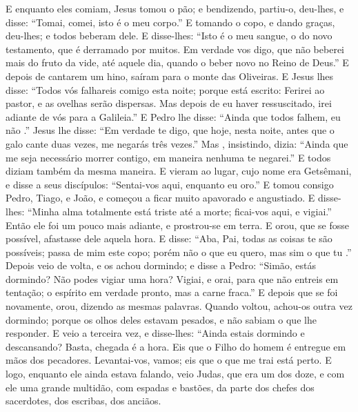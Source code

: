 {  E enquanto eles comiam, Jesus tomou o pão; e bendizendo, partiu-o, deu-lhes, e disse: “Tomai, comei, isto é o meu corpo.”
  E tomando o copo, e dando graças, deu-lhes; e todos beberam dele.
  E disse-lhes: “Isto é o meu sangue, o do novo testamento, que é derramado por muitos.
  Em verdade vos digo, que não beberei mais do fruto da vide, até aquele dia, quando o beber novo no Reino de Deus.”
  E depois de cantarem um hino, saíram para o monte das Oliveiras.
  E Jesus lhes disse: “Todos vós falhareis
 comigo esta noite; porque está escrito: Ferirei ao pastor, e as ovelhas serão dispersas.
{}
  Mas depois de eu haver ressuscitado, irei adiante de vós para a Galileia.”
  E Pedro lhe disse: “Ainda que todos falhem, eu não
{} .”
  Jesus lhe disse: “Em verdade te digo, que hoje, nesta noite, antes que o galo cante duas vezes, me negarás três vezes.”
  Mas
{},  insistindo, dizia: “Ainda que me seja necessário morrer contigo, em maneira nenhuma te negarei.” E todos diziam também da mesma maneira.
  E vieram ao lugar, cujo nome era Getsêmani, e disse a seus discípulos: “Sentai-vos aqui, enquanto eu oro.”
  E tomou consigo Pedro, Tiago, e João, e começou a ficar muito apavorado e angustiado.
  E disse-lhes: “Minha alma totalmente está triste até a morte; ficai-vos aqui, e vigiai.”
  Então ele foi um pouco mais adiante, e prostrou-se em terra. E orou, que se fosse possível, afastasse dele aquela hora.
  E disse: “Aba, Pai, todas as coisas te são possíveis; passa de mim este copo; porém não
{} o que eu quero, mas sim o que tu
{} .”
  Depois veio de volta, e os achou dormindo; e disse a Pedro: “Simão, estás dormindo? Não podes vigiar uma hora?
  Vigiai, e orai, para que não entreis em tentação; o espírito em verdade
{} pronto, mas a carne
{} fraca.”
  E depois que se foi novamente, orou, dizendo as mesmas palavras.
  Quando voltou, achou-os outra vez dormindo; porque os olhos deles estavam pesados, e não sabiam o que lhe responder.
  E veio a terceira vez, e disse-lhes: “Ainda estais dormindo e descansando?
 Basta, chegada é a hora. Eis que o Filho do homem é entregue em mãos dos pecadores.
  Levantai-vos, vamos; eis que o que me trai está perto.
  E logo, enquanto ele ainda estava falando, veio Judas, que era um dos doze, e com ele uma grande multidão, com espadas e bastões, da parte dos chefes dos sacerdotes, dos escribas, dos anciãos.
}

